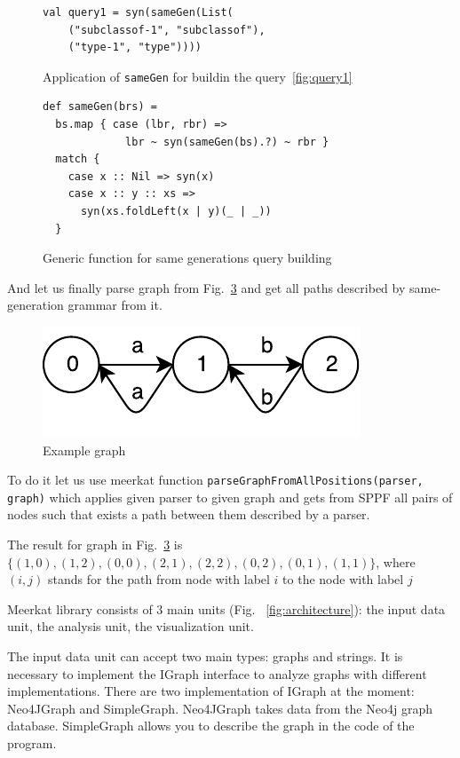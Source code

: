 \begin{figure}[h]
\begin{lstlisting}
val query1 = syn(sameGen(List(
    ("subclassof-1", "subclassof"),
    ("type-1", "type"))))
\end{lstlisting}
\caption{Application of \lstinline{sameGen} for buildin the query~\ref{fig:query1}}
\label{fig:query1Gen}
\end{figure}

\begin{figure}[h]
\begin{lstlisting}
def sameGen(brs) =
  bs.map { case (lbr, rbr) => 
             lbr ~ syn(sameGen(bs).?) ~ rbr } 
  match {
    case x :: Nil => syn(x)
    case x :: y :: xs => 
      syn(xs.foldLeft(x | y)(_ | _))
  }
\end{lstlisting}
\caption{Generic function for same generations query building}
\label{fig:gen}
\end{figure}

And let us finally parse graph from Fig.~\ref{fig:graph} and get all paths described by same-generation grammar from it.

\begin{figure}[h]
\includegraphics{graph}
\caption{Example graph}
\label{fig:graph}
\end{figure}

To do it let us use meerkat function \lstinline{parseGraphFromAllPositions(parser, graph)} which applies given parser to given graph and gets from SPPF all pairs of nodes such that exists a path between them described by a parser.

The result for graph in Fig.~\ref{fig:graph} is $\{(1,0), (1,2), (0,0), (2,1), (2,2), (0,2), (0,1), (1,1)\}$, where $(i,j)$ stands for the path from node with label $i$ to the node with label $j$

Meerkat library consists of 3 main units (Fig. ~\ref{fig:architecture}): the input data unit, the analysis unit, the visualization unit.

The input data unit can accept two main types: graphs and strings. It is necessary to implement the IGraph interface to analyze graphs with different implementations. There are two implementation of IGraph at the moment: Neo4JGraph and SimpleGraph. Neo4JGraph takes data from the Neo4j graph database. SimpleGraph allows you to describe the graph in the code of the program.

